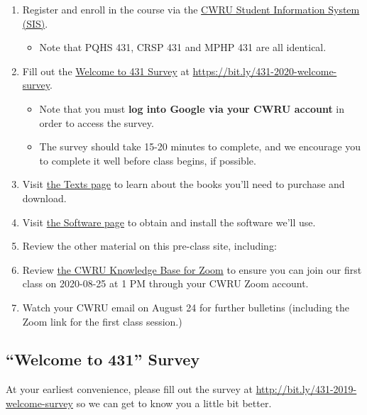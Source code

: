 \documentclass[
]{book}
\providecommand{\tightlist}{%
  \setlength{\itemsep}{0pt}\setlength{\parskip}{0pt}}
\begin{document}
\begin{enumerate}
\def\labelenumi{\arabic{enumi}.}
\tightlist
\item
  Register and enroll in the course via the \href{https://sis.case.edu/}{CWRU Student Information System (SIS)}.

  \begin{itemize}
  \tightlist
  \item
    Note that PQHS 431, CRSP 431 and MPHP 431 are all identical.
  \end{itemize}
\item
  Fill out the \href{https://bit.ly/431-2020-welcome-survey}{Welcome to 431 Survey} at \url{https://bit.ly/431-2020-welcome-survey}.

  \begin{itemize}
  \tightlist
  \item
    Note that you must \textbf{log into Google via your CWRU account} in order to access the survey.
  \item
    The survey should take 15-20 minutes to complete, and we encourage you to complete it well before class begins, if possible.
  \end{itemize}
\item
  Visit \href{texts.html}{the Texts page} to learn about the books you'll need to purchase and download.
\item
  Visit \href{software.html}{the Software page} to obtain and install the software we'll use.
\item
  Review the other material on this pre-class site, including:
\item
  Review \href{https://case.edu/utech/help/knowledge-base/zoom/zoom-information}{the CWRU Knowledge Base for Zoom} to ensure you can join our first class on 2020-08-25 at 1 PM through your CWRU Zoom account.
\item
  Watch your CWRU email on August 24 for further bulletins (including the Zoom link for the first class session.)
\end{enumerate}

\hypertarget{welcome-to-431-survey}{%
\subsection*{``Welcome to 431'' Survey}\label{welcome-to-431-survey}}

At your earliest convenience, please fill out the survey at \url{http://bit.ly/431-2019-welcome-survey} so we can get to know you a little bit better.
\end{document}
